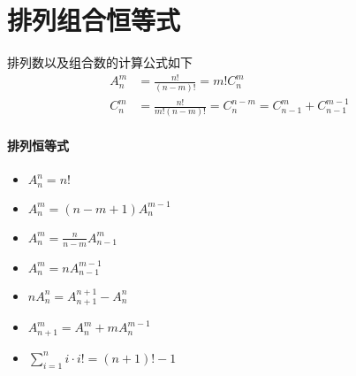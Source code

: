 \section{排列组合恒等式}
\begin{defination}
排列数以及组合数的计算公式如下
\[ \begin{aligned}
A^m_n &= \frac{n!}{(n-m)!} = m! C^m_n \\
C^m_n &= \frac{n!}{m!(n-m)!} = C^{n-m}_{n} = C^m_{n-1} + C^{m-1}_{n-1}
\end{aligned} \]
\end{defination}
\paragraph{排列恒等式}
\begin{itemize}
\item $A^n_n = n!$
\item $A^m_n = (n-m+1) A^{m-1}_n$
\item $A^{m}_{n} = \frac{n}{n-m} A^{m}_{n-1}$
\item $A^{m}_{n} = n A^{m-1}_{n-1}$
\item $nA^{n}_{n} = A^{n+1}_{n+1} - A^{n}_{n}$
\item $A^{m}_{n+1} = A^{m}_{n} + mA^{m-1}_{n}$
\item $\sum^n_{i=1} i \cdot i! = (n+1)! - 1$
\end{itemize}
